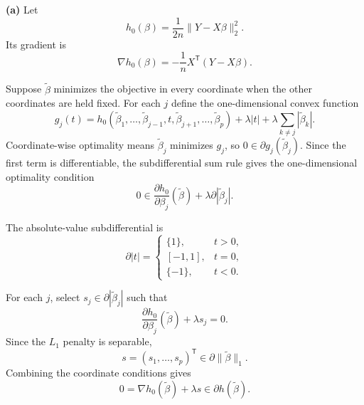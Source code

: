 \documentclass[answers,12pt,addpoints]{exam}
\providecommand{\trans}{^{\mathsf T}}
\begin{document}
\begin{questions}

\begin{solution}

\textbf{(a)}
Let
\[
h_0(\beta)=\frac1{2n}\|Y-X\beta\|_2^2.
\]
Its gradient is
\[
\nabla h_0(\beta)
=
-\frac1nX\trans(Y-X\beta).
\]

Suppose $\widetilde\beta$ minimizes the objective in every
coordinate when the other coordinates are held fixed.
For each $j$ define the one-dimensional convex function
\[
g_j(t)=h_0(\widetilde\beta_1,\ldots,\widetilde\beta_{j-1},t,
\widetilde\beta_{j+1},\ldots,\widetilde\beta_p)+\lambda|t|
+\lambda\sum_{k\neq j}|\widetilde\beta_k|.
\]
Coordinate-wise optimality means $\widetilde\beta_j$ minimizes $g_j$,
so $0\in\partial g_j(\widetilde\beta_j)$. Since the first term is
differentiable, the subdifferential sum rule gives the
one-dimensional optimality condition
\[
0\in
\frac{\partial h_0}{\partial\beta_j}(\widetilde\beta)
+\lambda\partial|\widetilde\beta_j|.
\]

The absolute-value subdifferential is
\[
\partial|t|
=
\begin{cases}
\{1\}, & t>0,\\
{[-1,1]}, & t=0,\\
\{-1\}, & t<0.
\end{cases}
\]

For each $j$, select
$s_j\in\partial|\widetilde\beta_j|$ such that
\[
\frac{\partial h_0}{\partial\beta_j}(\widetilde\beta)
+\lambda s_j=0.
\]
Since the $L_1$ penalty is separable,
\[
s=(s_1,\ldots,s_p)\trans
\in\partial\|\widetilde\beta\|_1.
\]
Combining the coordinate conditions gives
\[
0
=
\nabla h_0(\widetilde\beta)+\lambda s
\in\partial h(\widetilde\beta).
\]


\end{solution}
\end{questions}
\end{document}
